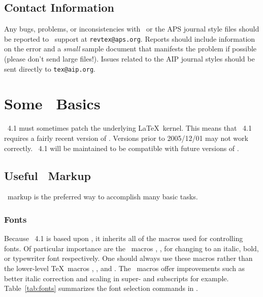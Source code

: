 \documentclass[%
,aps%
 ,twocolumn%
 ,secnumarabic%
,amssymb, amsmath,nobibnotes, aps, prl, floatfix]{revtex4-1}
\begin{document}
\subsection{Contact Information}\label{sec:aipresources}%
Any bugs, problems, or inconsistencies with \revtex\ or the APS journal style files should be reported to
\revtex\ support at \verb+revtex@aps.org+. Reports should include information on the error and a \textit{small}
sample document that manifests the problem if possible (please don't send large files!). Issues related to the AIP journal styles should be sent directly to \verb+tex@aip.org+.

\section{Some \LaTeXe\ Basics}
\revtex~4.1 must sometimes patch the underlying
\LaTeX\ kernel. This means that \revtex~4.1 requires a fairly recent version of
\LaTeXe. Versions prior to 2005/12/01 may not work
correctly. \revtex~4.1 will be maintained to be compatible with future
versions of \LaTeXe.

\subsection{Useful \LaTeXe\ Markup}
\LaTeXe\ markup is the preferred way to accomplish many basic tasks.

\subsubsection{Fonts}

Because \revtex~4.1 is based upon \LaTeXe, it inherits all of the
macros used for controlling fonts. Of particular importance are the
\LaTeXe\ macros \cmd{\textit}, \cmd{\textbf}, \cmd{\texttt} for changing to
an italic, bold, or typewriter font respectively. One should always
use these macros rather than the lower-level \TeX\ macros \cmd{\it},
\cmd{\bf}, and \cmd{\tt}. The \LaTeXe\ macros offer
improvements such as better italic correction and scaling in super-
and subscripts for example. Table~\ref{tab:fonts}
summarizes the font selection commands in \LaTeXe.
\end{document}

